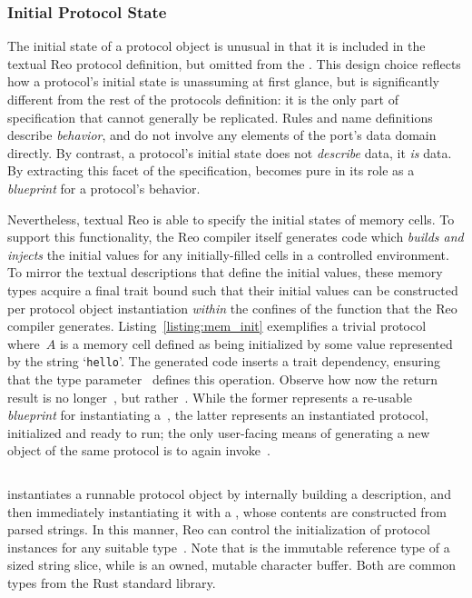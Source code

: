 \subsubsection{Initial Protocol State}
The initial state of a protocol object is unusual in that it is included in the textual Reo protocol definition, but omitted from the . This design choice reflects how a protocol's initial state is unassuming at first glance, but is significantly different from the rest of the protocols definition: it is the only part of specification that cannot generally be replicated. Rules and name definitions describe \textit{behavior}, and do not involve any elements of the port's data domain directly. By contrast, a protocol's initial state does not \textit{describe} data, it \textit{is} data. By extracting this facet of the specification,  becomes pure in its role as a \textit{blueprint} for a protocol's behavior. 

Nevertheless, textual Reo is able to specify the initial states of memory cells. To support this functionality, the Reo compiler itself generates code which \textit{builds and injects} the initial values for any initially-filled cells in a controlled environment. To mirror the textual descriptions that define the initial values, these memory types acquire a final trait bound such that their initial values can be constructed per protocol object instantiation \textit{within} the confines of the function that the Reo compiler generates. Listing~\ref{listing:mem_init} exemplifies a trivial protocol where~$A$ is a memory cell defined as being initialized by some value represented by the string `\texttt{hello}'. The generated code inserts a trait dependency, ensuring that the type parameter~ defines this operation. Observe how now the return result is no longer~, but rather~. While the former represents a re-usable \textit{blueprint} for instantiating a~, the latter represents an instantiated protocol, initialized and ready to run; the only user-facing means of generating a new object of the same protocol is to again invoke~.

\begin{listing}[ht]
	\centering
	\inputminted[]{rust}{mem_init.rs}
	\caption[Reo-generated builder function, returning a protocol instance.]{ instantiates a runnable protocol object by internally building a  description, and then immediately instantiating it with a , whose contents are constructed from parsed strings. In this manner, Reo can control the initialization of protocol instances for any suitable type~. Note that  is the immutable reference type of a sized string slice, while  is an owned, mutable character buffer. Both are common types from the Rust standard library.}
	\label{listing:mem_init}
\end{listing}


